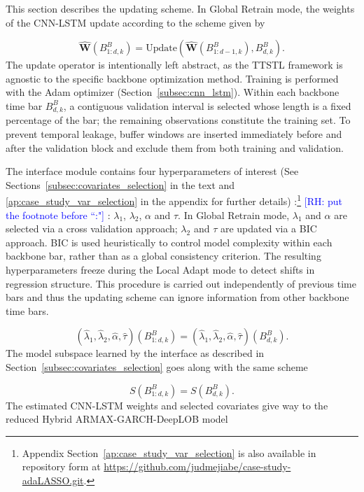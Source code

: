 \documentclass[10pt,a4paper,oneside]{article}
\newcommand{\rh}[1]{\textcolor{blue}{\textsf{[RH: #1]}}}
\providecommand{\DIFaddtex}[1]{{\protect\color{blue} \sf #1}} %
\providecommand{\DIFdeltex}[1]{{\protect\color{red} \scriptsize #1}} %
\providecommand{\DIFaddbegin}{} %
\providecommand{\DIFaddend}{} %
\providecommand{\DIFdelbegin}{} %
\providecommand{\DIFdelend}{} %
\providecommand{\DIFadd}[1]{\texorpdfstring{\DIFaddtex{#1}}{#1}} %
\providecommand{\DIFdel}[1]{\texorpdfstring{\DIFdeltex{#1}}{}} %
\newcommand{\DIFscaledelfig}{0.5}
\newlength{\DIFdelgraphicswidth} %
\newlength{\DIFdelgraphicsheight} %
\newcommand{\DIFaddincludegraphics}[2][]{{\color{blue}\fbox{\DIFOincludegraphics[#1]{#2}}}} %
\newcommand{\DIFdelincludegraphics}[2][]{%
\sbox{\DIFdelgraphicsbox}{\DIFOincludegraphics[#1]{#2}}%
\settoboxwidth{\DIFdelgraphicswidth}{\DIFdelgraphicsbox} %
\settoboxtotalheight{\DIFdelgraphicsheight}{\DIFdelgraphicsbox} %
\scalebox{\DIFscaledelfig}{%
\parbox[b]{\DIFdelgraphicswidth}{\usebox{\DIFdelgraphicsbox}\\[-\baselineskip] \rule{\DIFdelgraphicswidth}{0em}}\llap{\resizebox{\DIFdelgraphicswidth}{\DIFdelgraphicsheight}{%
\setlength{\unitlength}{\DIFdelgraphicswidth}%
\begin{picture}(1,1)%
\thicklines\linethickness{2pt} %
{\color[rgb]{1,0,0}\put(0,0){\framebox(1,1){}}}%
{\color[rgb]{1,0,0}\put(0,0){\line( 1,1){1}}}%
{\color[rgb]{1,0,0}\put(0,1){\line(1,-1){1}}}%
\end{picture}%
}\hspace*{3pt}}} %
} %
\DeclareRobustCommand{\DIFaddbegin}{\DIFOaddbegin \let\includegraphics\DIFaddincludegraphics} %
\DeclareRobustCommand{\DIFaddend}{\DIFOaddend \let\includegraphics\DIFOincludegraphics} %
\DeclareRobustCommand{\DIFdelbegin}{\DIFOdelbegin \let\includegraphics\DIFdelincludegraphics} %
\DeclareRobustCommand{\DIFdelend}{\DIFOaddend \let\includegraphics\DIFOincludegraphics} %
\begin{document}
This section describes the updating scheme. In Global Retrain mode, the weights of the CNN-LSTM update according to the scheme given by

$$
\hat{\mathbf{W}}(B^B_{1:d, k}) = \mathrm{Update}\left(\hat{\mathbf{W}}(B^B_{1:d-1, k}), B^B_{d, k} \right).
$$
The update operator is intentionally left abstract, as the TTSTL framework is agnostic to the specific backbone optimization method. Training is performed with the Adam optimizer (Section~\ref{subsec:cnn_lstm}). Within each backbone time bar \(B^B_{d,k}\), a contiguous validation interval is selected whose length is a fixed percentage of the bar; the remaining observations constitute the training set. To prevent temporal leakage, buffer windows are inserted immediately before and after the validation block and exclude them from both training and validation.

The interface module contains four hyperparameters of interest (See Sections~\ref{subsec:covariates_selection} in the text and \ref{ap:case_study_var_selection} in the appendix for further details)\DIFdelbegin \DIFdel{:}\DIFdelend \footnote{Appendix Section~\ref{ap:case_study_var_selection} is also available in repository form at \url{https://github.com/judmejiabe/case-study-adaLASSO.git}.}\DIFdelbegin \DIFdel{\rh{put the footnote before ``:"} }\DIFdelend \DIFaddbegin \DIFadd{: }\DIFaddend $\lambda_1$, $\lambda_2$, $\alpha$ and $\tau$. In Global Retrain mode, \(\lambda_1\) and \(\alpha\) are selected via a cross validation approach; \(\lambda_2\) and \(\tau\) are updated via a BIC approach. BIC is used heuristically to control model complexity within each backbone bar, rather than as a global consistency criterion. The resulting hyperparameters freeze during the Local Adapt mode to detect shifts in regression structure. This procedure is carried out independently of previous time bars and thus the updating scheme can ignore information from other backbone time bars.

$$
(\hat{\lambda}_1, \hat{\lambda}_2, \hat{\alpha}, \hat{\tau})(B^{B}_{1:d, k}) = (\hat{\lambda}_1, \hat{\lambda}_2, \hat{\alpha}, \hat{\tau})(B^{B}_{d, k}).
$$
The model subspace learned by the interface as described in Section~\ref{subsec:covariates_selection} goes along with the same scheme

$$
S(B^B_{1:d, k}) = S(B^B_{d, k}).
$$
The estimated CNN-LSTM weights and selected covariates give way to the reduced Hybrid ARMAX-GARCH-DeepLOB model
\end{document}

